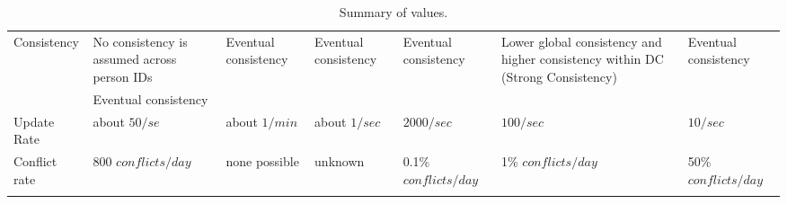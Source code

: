 \begin{landscape}
\begin{center}
\begin{longtable}{|p{2.2cm}||p{3.6cm}|p{3.4cm}|p{3.4cm}||p{3.8cm}|p{3.4cm}|p{3.1cm}|}
			Consistency & 
				No consistency is assumed across person IDs & 
				Eventual consistency & 
				Eventual consistency & 
				Eventual consistency & 
				\multirow{2}{3.6cm}{Lower global consistency and higher consistency within DC (Strong Consistency)} & 
				Eventual consistency \\ \cline{2-2}
	
				 & 
				Eventual consistency & 
				 & 
				 & 
				 & 
				 & 
				  \\
			\hline
				  
				Update Rate & 
				about $50/se$ &
				about $1 / min$ & 
				about $1 / sec$ & 
				$2000/sec$ & 
				$100/sec$ & 
				$10/sec$ \\
			\hline
			
			  Conflict rate	& 
			  800 $conflicts/ day$	& 
			  none possible	& 
			  unknown & 
			  0.1\% $conflicts/ day$  & 
			  1\% $conflicts/ day$ & 
			  50\% $conflicts/ day$ \\
			\hline
		
			\caption{Summary of values.}
			\label{tbl:metrics}
		\end{longtable}
	\end{center}
\end{landscape}